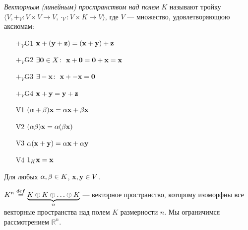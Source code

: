 \begin{definition}
    \textit{Векторным (линейным) пространством над полем} $K$ называют тройку
    $\langle V, +_V \colon V \times V \to V, \cdot_V \colon V \times K \to V
    \rangle$, где $V$ --- множество, удовлетворяющюю аксиомам:
\begin{enumerate}
    \item[$+_V$G1] $\mathbf{x} + (\mathbf{y} + \mathbf{z}) = (\mathbf{x} + \mathbf{y}) + \mathbf{z}$
    \item[$+_V$G2] $\exists \mathbf{0} \in X \colon~ \mathbf{x} + \mathbf{0} =
    \mathbf{0} + \mathbf{x} = \mathbf{x}$
    \item[$+_V$G3] $\exists -\mathbf{x} \colon~ \mathbf{x} + -\mathbf{x} = \mathbf{0}$
    \item[$+_V$G4] $\mathbf{x} + \mathbf{y} = \mathbf{y} + \mathbf{z}$
    \item[V1] $(\alpha + \beta)\mathbf{x} = \alpha\mathbf{x} + \beta\mathbf{x}$
    \item[V2] $(\alpha\beta)\mathbf{x} = \alpha(\beta\mathbf{x})$
    \item[V3] $\alpha(\mathbf{x} + \mathbf{y}) = \alpha\mathbf{x} + \alpha\mathbf{y}$
    \item[V4] $1_K \mathbf{x} = \mathbf{x}$
\end{enumerate}
Для любых $\alpha, \beta \in K$, $\mathbf{x}, \mathbf{y} \in V$.
\end{definition}
\begin{example}
    $K^n \overset{def}{\underset{}{=}} \underbrace{K \oplus K \oplus \ldots \oplus K}_{n}$
        --- векторное пространство, которому изоморфны все векторные
        пространства над полем $K$ размерности $n$. Мы ограничимся
        рассмотрением $\mathbb{R}^n$.
\end{example}
